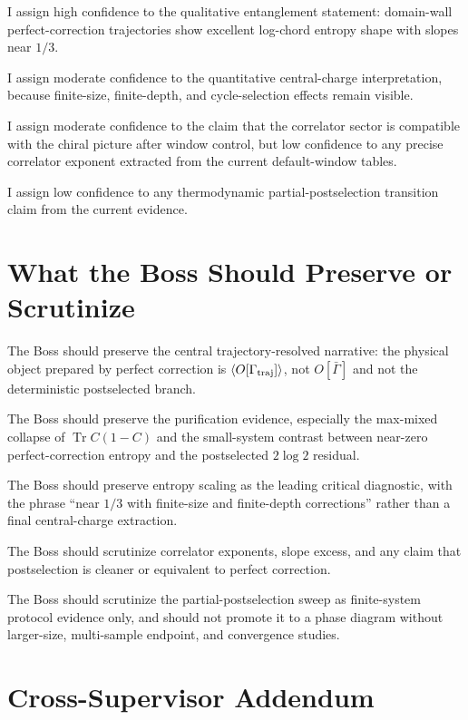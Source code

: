 \documentclass[aps,prb,onecolumn,nofootinbib,superscriptaddress]{revtex4-2}
\begin{document}
I assign high confidence to the qualitative entanglement statement: domain-wall perfect-correction trajectories show excellent log-chord entropy shape with slopes near $1/3$.

I assign moderate confidence to the quantitative central-charge interpretation, because finite-size, finite-depth, and cycle-selection effects remain visible.

I assign moderate confidence to the claim that the correlator sector is compatible with the chiral picture after window control, but low confidence to any precise correlator exponent extracted from the current default-window tables.

I assign low confidence to any thermodynamic partial-postselection transition claim from the current evidence.

\section{What the Boss Should Preserve or Scrutinize}

The Boss should preserve the central trajectory-resolved narrative: the physical object prepared by perfect correction is $\langle O[\Gamma_{\rm traj}]\rangle$, not $O[\bar{\Gamma}]$ and not the deterministic postselected branch.

The Boss should preserve the purification evidence, especially the max-mixed collapse of $\operatorname{Tr}C(1-C)$ and the small-system contrast between near-zero perfect-correction entropy and the postselected $2\log2$ residual.

The Boss should preserve entropy scaling as the leading critical diagnostic, with the phrase ``near $1/3$ with finite-size and finite-depth corrections'' rather than a final central-charge extraction.

The Boss should scrutinize correlator exponents, slope excess, and any claim that postselection is cleaner or equivalent to perfect correction.

The Boss should scrutinize the partial-postselection sweep as finite-system protocol evidence only, and should not promote it to a phase diagram without larger-size, multi-sample endpoint, and convergence studies.

\section{Cross-Supervisor Addendum}
\end{document}
